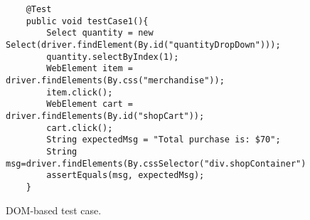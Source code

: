 \begin{figure}
\begin{lstlisting}
	@Test
	public void testCase1(){
		Select quantity = new Select(driver.findElement(By.id("quantityDropDown")));
		quantity.selectByIndex(1);
		WebElement item = driver.findElements(By.css("merchandise"));
		item.click();
		WebElement cart = driver.findElements(By.id("shopCart"));
		cart.click();		
		String expectedMsg = "Total purchase is: $70";	
		String msg=driver.findElements(By.cssSelector("div.shopContainer")).getText();
		assertEquals(msg, expectedMsg);
	}
\end{lstlisting}
\caption{DOM-based \selenium test case.}
\label{Fig:domTest}
\end{figure}